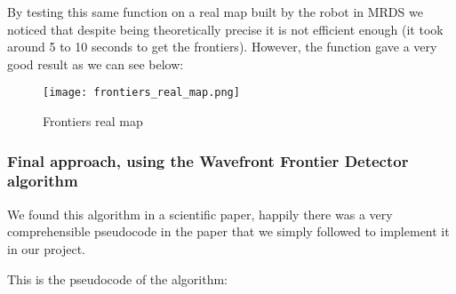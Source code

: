 By testing this same function on a real map built by the robot in MRDS we noticed that despite being theoretically precise it is not efficient enough (it took around 5 to 10 seconds to get the frontiers).
However, the function gave a very good result as we can see below:

\FloatBarrier
\begin{figure}
    \centering\texttt{[image: frontiers\_real\_map.png]}
    \label{fig:frontiers_real_map}
    \caption{Frontiers real map}
\end{figure}
\FloatBarrier

\subsubsection{Final approach, using the Wavefront Frontier Detector algorithm}

We found this algorithm in a scientific paper, happily there was a very comprehensible pseudocode in the paper that we simply followed to implement it in our project.

This is the pseudocode of the algorithm:

